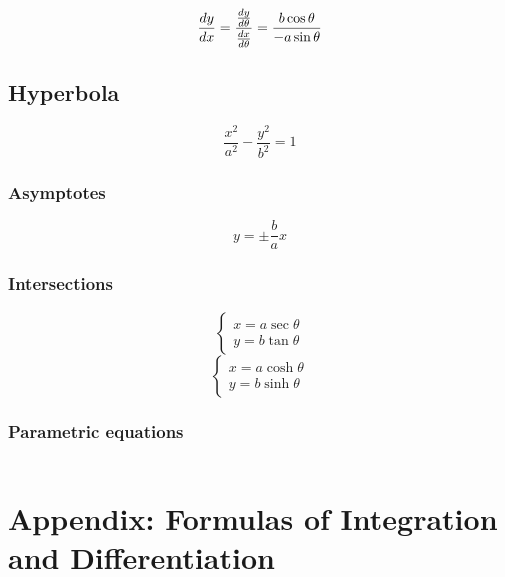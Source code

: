 \documentclass[a4paper,9pt]{scrartcl}
\begin{document}
    \begin{displaymath}
        \frac{dy}{dx} = \frac{\frac{dy}{d\theta}}{\frac{dx}{d\theta}} = \frac{b\cos\theta}{-a\sin\theta} \\
    \end{displaymath}

    \subsection{Hyperbola}

    \begin{displaymath}
        \frac{x^2}{a^2} - \frac{y^2}{b^2} = 1
    \end{displaymath}

    \subsubsection{Asymptotes}
    \begin{displaymath}
        y = \pm\frac{b}{a}x
    \end{displaymath}

    \subsubsection{Intersections}
    \begin{displaymath}
        \left\{
        \begin{array}{c}
            x = a\sec\theta \\
            y = b\tan\theta
        \end{array}
    \end{displaymath}
    \begin{displaymath}
        \left\{
        \begin{array}{c}
            x = a\cosh\theta \\
            y = b\sinh\theta
        \end{array}
    \end{displaymath}

    \subsubsection{Parametric equations}
    \begin{displaymath}

    \end{displaymath}


    \section{Appendix: Formulas of Integration and Differentiation}
\end{document}
